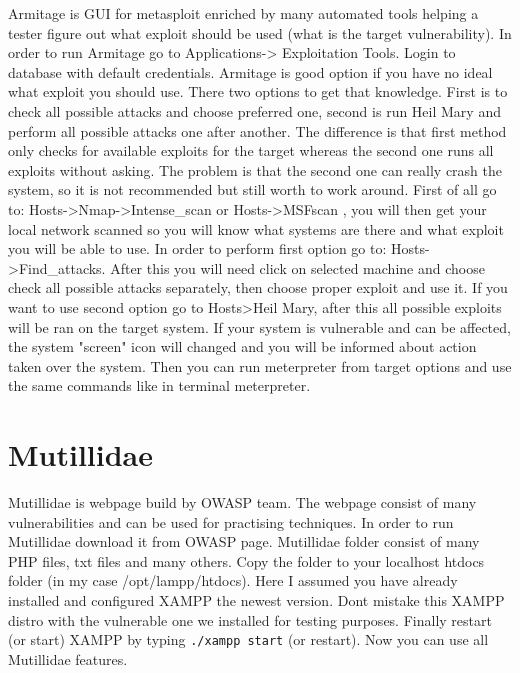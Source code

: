 \documentclass{article}[12pt]
\begin{document}
Armitage is GUI for metasploit enriched by many automated tools helping a tester figure out what exploit should be used (what is the target vulnerability).
In order to run Armitage go to Applications-> Exploitation Tools.
Login to database with default credentials.
Armitage is good option if you have no ideal what exploit you should use.
There two options to get that knowledge.
First is to check all possible attacks and choose preferred one, second is run Heil Mary and perform all possible attacks one after another.
The difference is that first method
only checks for available exploits for the target whereas the second one runs all exploits without asking.
The problem is that the second one can really crash the system, so it is not recommended but still worth to work around.
First of all go to: Hosts->Nmap->Intense\_scan or Hosts->MSFscan
, you will then get your local network scanned so you will know what systems are there and what exploit you will be able to use.
In order to perform first option go to: Hosts->Find\_attacks.
After this you will need click on selected machine and choose check all possible attacks separately, then choose proper exploit and use it.
If you want to use second option go to Hosts>Heil Mary, after this all possible exploits will be ran on the target system.
If your system is vulnerable and can be affected, the system "screen" icon will changed and you will be informed about action taken over the system.
Then you can run meterpreter from target options and use the same commands like in terminal meterpreter.





\section{Mutillidae} Mutillidae is webpage build by OWASP team.
The webpage consist of many vulnerabilities and can be used for practising techniques.
In order to run Mutillidae download it from OWASP page.
Mutillidae folder consist of many PHP files, txt files and many others.
Copy the folder to your localhost htdocs folder (in my case /opt/lampp/htdocs).
Here I assumed you have already installed and configured XAMPP the newest version.
Dont mistake this XAMPP distro with the vulnerable one we installed for testing purposes.
Finally restart (or start) XAMPP by typing \texttt{./xampp start} (or restart).
Now you can use all Mutillidae features.
\end{document}
